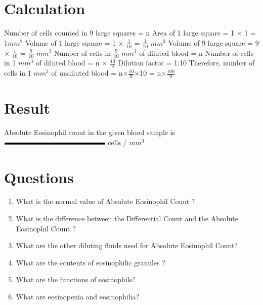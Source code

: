 \documentclass[a4paper,12pt]{book}
\begin{document}
					\section*{Calculation}
					Number of cells counted in 9 large squares				=	n\newline\vspace{.2cm}
					Area of 1 large square				=	1 $\times$ 1		=	1$mm^2$	\newline\vspace{.2cm}
					Volume of 1 large square				=	1 $\times$ $\frac{1}{10}$	=	$\frac{1}{10}$ $mm^3$\newline\vspace{.2cm}
					Volume of 9 large square				=	9 $\times$ $\frac{1}{10}$	=	$\frac{9}{10}$ $mm^3$\newline\vspace{.2cm}
					Number of cells in $\frac{9}{10}$ $mm^3$ of diluted blood				=	n\newline\vspace{.2cm}
					Number of cells in 1 $mm^3$ of diluted blood				=	n $\times$ $\frac{10}{9}$\newline\vspace{.2cm}
					Dilution factor								=	1:10\newline\vspace{.2cm}
					Therefore, number of cells in 1 $mm^3$ of undiluted blood		=	n$\times$$\frac{10}{9}$$\times$10
					=	n$\times$$\frac{100}{9}$
					\section*{Result}

					Absolute Eosinophil count in the given  blood sample is $\rule{5cm}{0.1cm}$ cells / $mm^3$

					\section*{Questions}
					\begin{enumerate}

						\item{What is the normal value of Absolute Eosinophil Count ?}
						\item{What is the difference between the Differential Count and the Absolute Eosinophil Count ?}
						\item{What are the other diluting fluids used for Absolute Eosinophil Count?}
						\item{What are the contents of eosinophilic granules ?}
						\item{What are the functions of eosinophils?}
						\item{What are eosinopenia and eosinophilia?}
					\end{enumerate}
\end{document}
